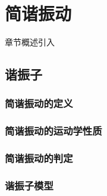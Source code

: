 \chapter{简谐振动}\label{5}

章节概述引入

\section{谐振子}\label{5-1}

\subsection{简谐振动的定义}\label{5-1-1}

\subsection{简谐振动的运动学性质}\label{5-1-2}

\subsection{简谐振动的判定}\label{5-1-3}

\subsection{谐振子模型}\label{5-1-4}
